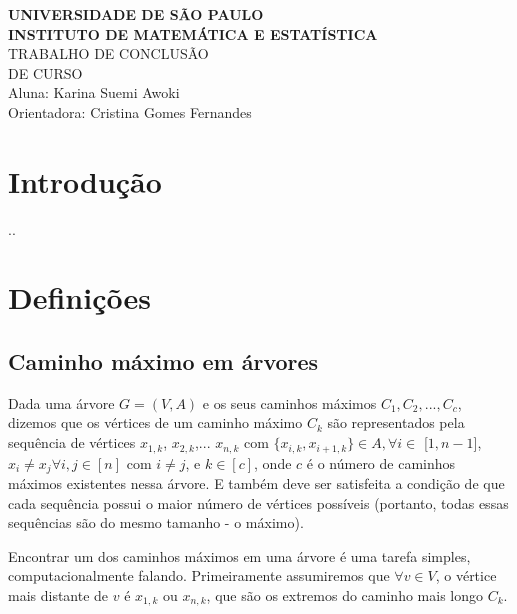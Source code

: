 \documentclass[a4paper,12pt]{article}
\begin{document}
\begin{center}
   {\large \textbf{UNIVERSIDADE DE SÃO PAULO}} \\[1.4cm]
   
   {\large \textbf{INSTITUTO DE MATEMÁTICA E ESTATÍSTICA}}\\[4.2cm]
   
   {\Huge TRABALHO DE CONCLUSÃO }\\[0.3cm]
   {\Huge DE CURSO }\\[9cm]
   
   {\large { Aluna: Karina Suemi Awoki}}\\[0.3cm]
   
   {\large { Orientadora: Cristina Gomes Fernandes}}
   

\end{center}

\newpage
\section{Introdução}
..
\bigskip

\section{Definições}
    
    \subsection{Caminho máximo em árvores}

        Dada uma árvore $G = (V,A)$ e os seus caminhos máximos 
        $C_1, C_2,..., C_c$, dizemos que os vértices de um caminho
        máximo $C_k$ são representados pela sequência de vértices 
        $x_{1, k}$, $x_{2, k}$,... $x_{n, k}$ com 
        $\{x_{i, k}, x_{i+1, k}\} \in A, \forall i \in$ [$1, n-1$],
        $x_i\neq x_j \forall i, j \in [n]$ 
        com $i \neq j$, 
        e $k \in [c]$, 
        onde $c$ é o número de caminhos máximos existentes nessa
        árvore.
        E também deve ser satisfeita a condição de que cada 
        sequência possui o maior número de vértices possíveis 
        (portanto, todas essas sequências são do mesmo tamanho - 
        o máximo).

        \bigskip

        Encontrar um dos caminhos máximos em uma árvore é uma 
        tarefa simples, computacionalmente falando. Primeiramente
        assumiremos que $\forall v \in V$, o vértice mais distante
        de $v$ é $x_{1, k}$ ou $x_{n, k}$, que são os extremos do
        caminho mais longo $C_k$.
\end{document}
